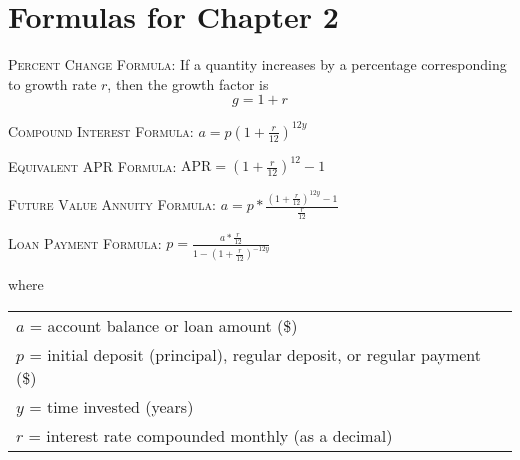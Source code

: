 
\section*{Formulas for Chapter 2}  

 \bigskip
 \bigskip
\noindent \hrulefill
 \bigskip
 \bigskip

 \noindent \textsc{Percent Change Formula:} \quad
 If a quantity increases by a percentage corresponding to growth rate $r$, then the growth factor is $$\displaystyle g=1+r$$ 
 
\noindent \hrulefill
 \bigskip
 \bigskip

\noindent \textsc{Compound Interest Formula:} \quad
$\displaystyle a = p \left( 1 + \frac{r}{12}\right) ^{12y}$ 

\bigskip
\bigskip

\noindent \textsc{Equivalent APR Formula:} \quad 
$\displaystyle \text{APR} = \left(1+\frac{r}{12}\right)^{12}-1$ 

\bigskip
\bigskip

\noindent  \textsc{Future Value Annuity Formula:} \quad
$\displaystyle a = p \ast \frac{\left( 1 + \frac{r}{12}\right) ^{12y}-1}{\frac{r}{12}}$ 

\bigskip
\bigskip

\noindent  \textsc{Loan Payment Formula:} \quad
$\displaystyle p = \frac{a  \ast \frac{r}{12}}{1-\left( 1 + \frac{r}{12}\right) ^{-12y}}$ 

\bigskip
\bigskip

\noindent  where 
\begin{center}
\begin{tabular} {l} 

$a$ = account balance or loan amount (\$) \\
$p$ = initial deposit (principal), regular deposit, or regular payment (\$) \\
$y$ = time invested (years)\\
$r$ = interest rate compounded monthly (as a decimal) \\ 
\end{tabular}
\end{center}

 \bigskip
 \bigskip
\noindent \hrulefill
 \bigskip
 \bigskip

\vfill %